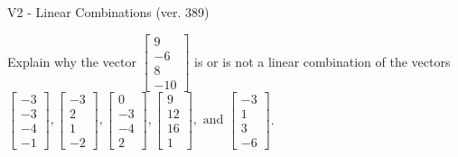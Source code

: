 \begin{exercise}
  \begin{exerciseTitle}V2 - Linear Combinations (ver. 389)\end{exerciseTitle}
  \begin{exerciseStatement}
    Explain why the vector \(\left[\begin{array}{c}
9 \\
-6 \\
8 \\
-10
\end{array}\right]\)  is or is not a linear 
	combination of the vectors \(\left[\begin{array}{c}
-3 \\
-3 \\
-4 \\
-1
\end{array}\right] , \left[\begin{array}{c}
-3 \\
2 \\
1 \\
-2
\end{array}\right] , \left[\begin{array}{c}
0 \\
-3 \\
-4 \\
2
\end{array}\right] , \left[\begin{array}{c}
9 \\
12 \\
16 \\
1
\end{array}\right] , \text{ and } \left[\begin{array}{c}
-3 \\
1 \\
3 \\
-6
\end{array}\right]\).
	



\end{exerciseStatement}
\end{exercise}
